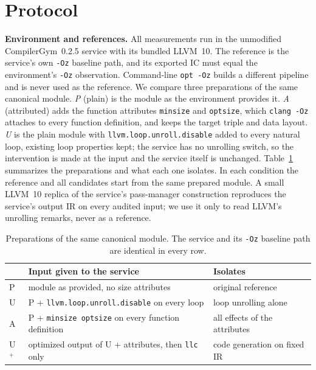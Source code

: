 \documentclass[conference,a4paper]{IEEEtran}
\begin{document}
\section{Protocol}
\textbf{Environment and references.} All measurements run in the
unmodified CompilerGym~0.2.5 service with its bundled LLVM~10. The
reference is the service's own \texttt{-Oz} baseline path, and its
exported IC must equal the environment's \texttt{-Oz} observation.
Command-line \texttt{opt -Oz} builds a different pipeline and is never
used as the reference. We compare three preparations of the same
canonical module. \emph{P} (plain) is the module as the environment
provides it. \emph{A} (attributed) adds the function attributes
\texttt{minsize} and \texttt{optsize}, which \texttt{clang -Oz} attaches
to every function definition, and keeps the target triple and data
layout. \emph{U} is the plain module with
\texttt{llvm.loop.unroll.disable} added to every natural loop, existing
loop properties kept; the service has no unrolling switch, so the
intervention is made at the input and the service itself is unchanged.
Table~\ref{tab:prep} summarizes the preparations and what each one
isolates. In each condition the reference and all candidates start from
the same prepared module. A small LLVM~10 replica of the service's pass-manager
construction reproduces the service's output IR on every audited input;
we use it only to read LLVM's unrolling remarks, never as a reference.

\begin{table}[t]
\caption{Preparations of the same canonical module. The service and
its \texttt{-Oz} baseline path are identical in every row.}
\label{tab:prep}
\centering
\footnotesize
\setlength{\tabcolsep}{3pt}
\begin{tabular}{@{}l>{\raggedright\arraybackslash}p{}>{\raggedright\arraybackslash}p{}@{}}
\toprule
 & Input given to the service & Isolates \\
\midrule
P & module as provided, no size attributes & original reference \\
U & P + \texttt{llvm.loop.unroll.disable} on every loop & loop unrolling
alone \\
A & P + \texttt{minsize optsize} on every function definition & all
effects of the attributes \\
U$^{+}$ & optimized output of U + attributes, then \texttt{llc} only &
code generation on fixed IR \\
\bottomrule
\end{tabular}
\end{table}
\end{document}
